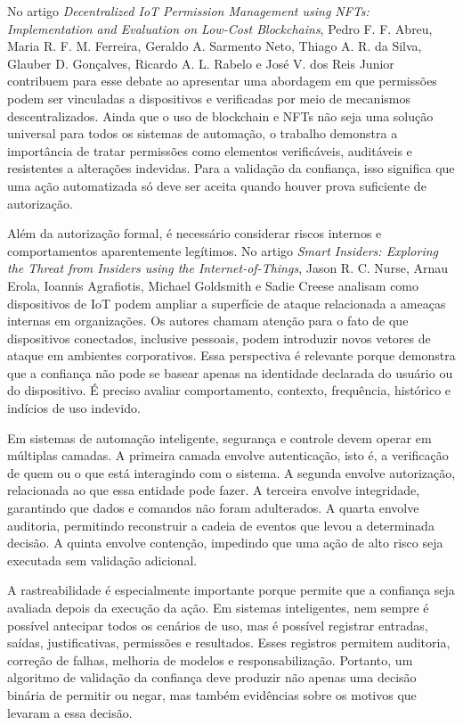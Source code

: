\documentclass[12pt]{article}
\begin{document}
No artigo \textit{Decentralized IoT Permission Management using NFTs: Implementation and Evaluation on Low-Cost Blockchains}, Pedro F. F. Abreu, Maria R. F. M. Ferreira, Geraldo A. Sarmento Neto, Thiago A. R. da Silva, Glauber D. Gonçalves, Ricardo A. L. Rabelo e José V. dos Reis Junior \cite{abreu2025} contribuem para esse debate ao apresentar uma abordagem em que permissões podem ser vinculadas a dispositivos e verificadas por meio de mecanismos descentralizados. Ainda que o uso de blockchain e NFTs não seja uma solução universal para todos os sistemas de automação, o trabalho demonstra a importância de tratar permissões como elementos verificáveis, auditáveis e resistentes a alterações indevidas. Para a validação da confiança, isso significa que uma ação automatizada só deve ser aceita quando houver prova suficiente de autorização.

Além da autorização formal, é necessário considerar riscos internos e comportamentos aparentemente legítimos. No artigo \textit{Smart Insiders: Exploring the Threat from Insiders using the Internet-of-Things}, Jason R. C. Nurse, Arnau Erola, Ioannis Agrafiotis, Michael Goldsmith e Sadie Creese \cite{nurse2015} analisam como dispositivos de IoT podem ampliar a superfície de ataque relacionada a ameaças internas em organizações. Os autores chamam atenção para o fato de que dispositivos conectados, inclusive pessoais, podem introduzir novos vetores de ataque em ambientes corporativos. Essa perspectiva é relevante porque demonstra que a confiança não pode se basear apenas na identidade declarada do usuário ou do dispositivo. É preciso avaliar comportamento, contexto, frequência, histórico e indícios de uso indevido.

Em sistemas de automação inteligente, segurança e controle devem operar em múltiplas camadas. A primeira camada envolve autenticação, isto é, a verificação de quem ou o que está interagindo com o sistema. A segunda envolve autorização, relacionada ao que essa entidade pode fazer. A terceira envolve integridade, garantindo que dados e comandos não foram adulterados. A quarta envolve auditoria, permitindo reconstruir a cadeia de eventos que levou a determinada decisão. A quinta envolve contenção, impedindo que uma ação de alto risco seja executada sem validação adicional.

A rastreabilidade é especialmente importante porque permite que a confiança seja avaliada depois da execução da ação. Em sistemas inteligentes, nem sempre é possível antecipar todos os cenários de uso, mas é possível registrar entradas, saídas, justificativas, permissões e resultados. Esses registros permitem auditoria, correção de falhas, melhoria de modelos e responsabilização. Portanto, um algoritmo de validação da confiança deve produzir não apenas uma decisão binária de permitir ou negar, mas também evidências sobre os motivos que levaram a essa decisão.
\end{document}
